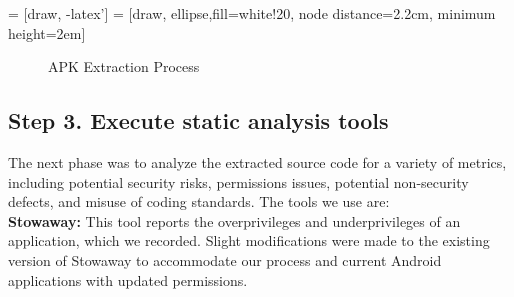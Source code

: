 \documentclass{sig-alternate}
\begin{document}
 = [draw, -latex']
 = [draw, ellipse,fill=white!20, node distance=2.2cm,
    minimum height=2em]

	\begin{figure}[h]
	\begin{center}

\caption{APK Extraction Process}
\label{fig:extractionprocess}
\end{center}
\end{figure}

\vspace{-2 mm}

\subsection{Step 3. Execute static analysis tools}
\label{sec: analysis}

The next phase was to analyze the extracted source code for a variety of metrics, including potential security risks, permissions issues, potential non-security defects, and misuse of coding standards. The tools we use  are:\\


 \textbf{Stowaway:} This tool reports the overprivileges and underprivileges of an application, which we recorded. Slight modifications were made to the existing version of Stowaway to accommodate our process and current Android applications with updated permissions. %
\end{document}
